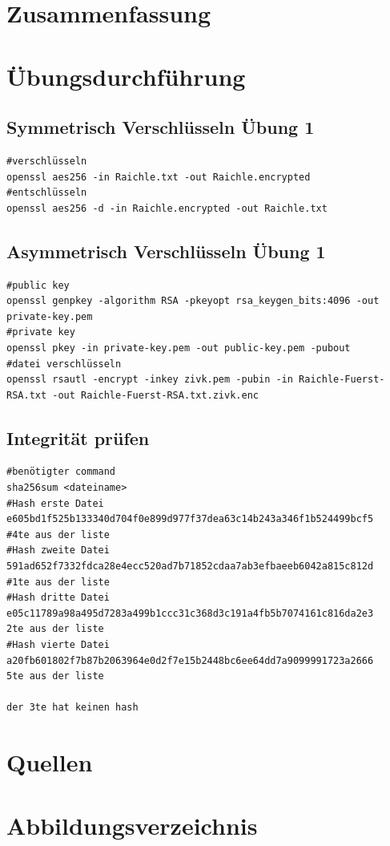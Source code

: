 \documentclass[a4paper]{article}
\begin{document}
\section{Zusammenfassung}


\newpage

\section{Übungsdurchführung}

\subsection{Symmetrisch Verschlüsseln Übung 1}
\begin{lstlisting}
#verschlüsseln
openssl aes256 -in Raichle.txt -out Raichle.encrypted
#entschlüsseln
openssl aes256 -d -in Raichle.encrypted -out Raichle.txt
\end{lstlisting}

\subsection{Asymmetrisch Verschlüsseln Übung 1}
\begin{lstlisting}
#public key
openssl genpkey -algorithm RSA -pkeyopt rsa_keygen_bits:4096 -out private-key.pem
#private key
openssl pkey -in private-key.pem -out public-key.pem -pubout
#datei verschlüsseln
openssl rsautl -encrypt -inkey zivk.pem -pubin -in Raichle-Fuerst-RSA.txt -out Raichle-Fuerst-RSA.txt.zivk.enc
\end{lstlisting}

\subsection{Integrität prüfen}
\begin{lstlisting}
#benötigter command
sha256sum <dateiname>
#Hash erste Datei
e605bd1f525b133340d704f0e899d977f37dea63c14b243a346f1b524499bcf5
#4te aus der liste
#Hash zweite Datei
591ad652f7332fdca28e4ecc520ad7b71852cdaa7ab3efbaeeb6042a815c812d
#1te aus der liste
#Hash dritte Datei
e05c11789a98a495d7283a499b1ccc31c368d3c191a4fb5b7074161c816da2e3
2te aus der liste
#Hash vierte Datei
a20fb601802f7b87b2063964e0d2f7e15b2448bc6ee64dd7a9099991723a2666
5te aus der liste

der 3te hat keinen hash
\end{lstlisting}



\newpage
\section{Quellen}

\newpage
\section{Abbildungsverzeichnis}

\listoffigures
\end{document}
